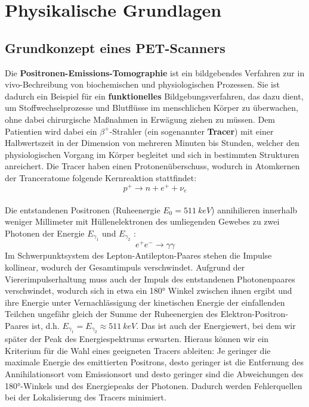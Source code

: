 \section{Physikalische Grundlagen}
\subsection{Grundkonzept eines PET-Scanners}
	Die \textbf{Positronen-Emissions-Tomographie} ist ein bildgebendes Verfahren zur in vivo-Bechreibung von biochemischen und physiologischen Prozessen. Sie ist dadurch ein Beispiel für ein \textbf{funktionelles} Bildgebungsverfahren, das dazu dient, um Stoffwechselprozesse und Blutflüsse im menschlichen Körper zu überwachen, ohne dabei chirurgische Maßnahmen in Erwägung ziehen zu müssen. Dem Patientien wird dabei ein $\beta^+$-Strahler (ein sogenannter \textbf{Tracer}) mit einer Halbwertszeit in der Dimension von mehreren Minuten bis Stunden, welcher den physiologischen Vorgang im Körper begleitet und sich in bestimmten Strukturen anreichert. Die Tracer haben einen Protonenüberschuss, wodurch in Atomkernen der Tranceratome folgende Kernreaktion stattfindet: 
	\begin{equation*}
	p^+ \longrightarrow n + e^+ + \nu_e
	\end{equation*}\\
	Die entstandenen Positronen (Ruheenergie $E_0 = 511\ \unit{keV}$) annihilieren innerhalb weniger Millimeter mit Hüllenelektronen des umliegenden Gewebes zu zwei Photonen der Energie $E_{\gamma_1}$ und $E_{\gamma_2}$ :\\
	\begin{equation*}
		e^+ e^- \longrightarrow \gamma \gamma
	\end{equation*}
	Im Schwerpunktsystem des Lepton-Antilepton-Paares stehen die Impulse kollinear, wodurch der Gesamtimpuls verschwindet. Aufgrund der Viererimpulserhaltung muss auch der Impuls des entstandenen Photonenpaares verschwindet, wodurch sich in etwa ein 180° Winkel zwischen ihnen ergibt und ihre Energie unter Vernachlässigung der kinetischen Energie der einfallenden Teilchen ungefähr gleich der Summe der Ruheenergien des Elektron-Positron-Paares ist, d.h. $E_{\gamma_1} = E_{\gamma_2} \approx 511\ \unit{keV}$. Das ist auch der Energiewert, bei dem wir später der Peak des Energiespektrums erwarten. Hieraus können wir ein Kriterium für die Wahl eines geeigneten Tracers ableiten: Je geringer die maximale Energie des emittierten Positrons, desto geringer ist die Entfernung des Annihilationsort vom Emissionsort und desto geringer sind die Abweichungen des 180°-Winkels und des Energiepeaks der Photonen. Dadurch werden Fehlerquellen bei der Lokalisierung des Tracers minimiert.\\
	
